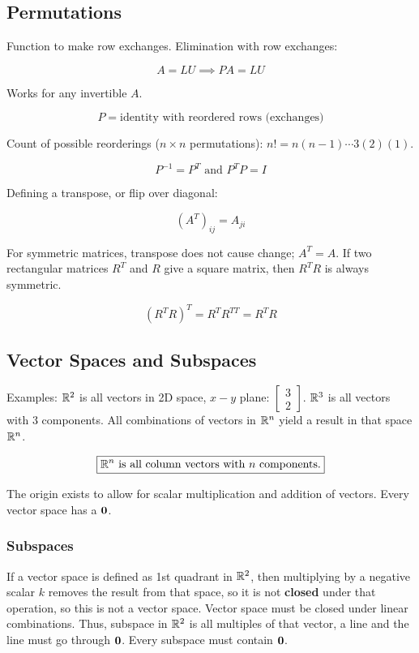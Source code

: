 \subsection{Permutations}

Function to make row exchanges. Elimination with row exchanges:

\[A=LU\implies PA=LU\]

Works for any invertible $A$.

\[P=\text{identity with reordered rows (exchanges)}\]

Count of possible reorderings ($n\times n$ permutations): $n! = n(n-1)\cdots 3(2)(1)$.

\[\boxed{P^{-1}=P^T\text{ and }P^TP=I}\]

Defining a transpose, or flip over diagonal:

\[(A^T)_{ij}=A_{ji}\]

For symmetric matrices, transpose does not cause change; $A^T=A$. If two rectangular matrices $R^T$ and $R$
give a square matrix, then $R^TR$ is always symmetric.

\[\boxed{(R^TR)^T=R^TR^{TT}=R^TR}\]

\subsection{Vector Spaces and Subspaces}

Examples: $\mathbb{R}^2$ is all vectors in 2D space, $x-y$ plane: $\begin{bmatrix}3\\2\end{bmatrix}$.
$\mathbb{R}^3$ is all vectors with 3 components. All combinations of vectors in $\mathbb{R}^n$ yield a result in that space $\mathbb{R}^n$.

\[\boxed{\mathbb{R}^n\text{ is all column vectors with $n$ components.}}\]

The origin exists to allow for scalar multiplication and addition of vectors. Every vector space has a $\textbf{0}$.

\subsubsection{Subspaces}

If a vector space is defined as 1st quadrant in $\mathbb{R}^2$, then multiplying by a negative scalar $k$ 
removes the result from that space, so it is not \textbf{closed} under that operation, so this is not a vector space. 
Vector space must be closed under linear combinations. Thus, subspace in $\mathbb{R}^2$ is all multiples of that vector, a line and the line must go through $\textbf{0}$.
Every subspace must contain $\textbf{0}$.\newline

